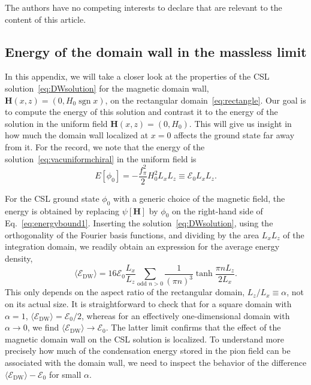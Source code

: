 \documentclass[pdflatex,iicol,sn-mathphys-num]{sn-jnl}
\let\a=\alpha
\let\p=\phi
\newcommand{\Ea}{\mathscr{E}}%
\newcommand{\vek}[1]{\bm{#1}}%
\begin{document}
The authors have no competing interests to declare that are relevant to the content of this article.


\begin{appendices}

\section{Energy of the domain wall in the massless limit}
\label{app:domainwall}

In this appendix, we will take a closer look at the properties of the CSL solution~\eqref{eq:DWsolution} for the magnetic domain wall, $\vek H(x,z)=(0,H_0\operatorname{sgn}x)$, on the rectangular domain~\eqref{eq:rectangle}. Our goal is to compute the energy of this solution and contrast it to the energy of the solution in the uniform field $\vek H(x,z)=(0,H_0)$. This will give us insight in how much the domain wall localized at $x=0$ affects the ground state far away from it. For the record, we note that the energy of the solution~\eqref{eq:vacuniformchiral} in the uniform field is
\begin{equation}
E[\p_0]=-\frac{f_\pi^2}{2}H_0^2L_xL_z\equiv\Ea_0L_xL_z.
\label{eq:Evacuniform}
\end{equation}

For the CSL ground state $\p_0$ with a generic choice of the magnetic field, the energy is obtained by replacing $\psi[\vek H]$ by $\p_0$ on the right-hand side of Eq.~\eqref{eq:energybound1}. Inserting the solution~\eqref{eq:DWsolution}, using the orthogonality of the Fourier basis functions, and dividing by the area $L_xL_z$ of the integration domain, we readily obtain an expression for the average energy density,
\begin{equation}
\langle\Ea_\text{DW}\rangle=16\Ea_0\frac{L_x}{L_z}\sum_{\text{odd }n>0}\frac{1}{(\pi n)^3}\tanh\frac{\pi nL_z}{2L_x}.
\label{eq:DWaverageE}
\end{equation}
This only depends on the aspect ratio of the rectangular domain, $L_z/L_x\equiv\a$, not on its actual size. It is straightforward to check that for a square domain with $\a=1$, $\langle\Ea_\text{DW}\rangle=\Ea_0/2$, whereas for an effectively one-dimensional domain with $\a\to0$, we find $\langle\Ea_\text{DW}\rangle\to\Ea_0$. The latter limit confirms that the effect of the magnetic domain wall on the CSL solution is localized. To understand more precisely how much of the condensation energy stored in the pion field can be associated with the domain wall, we need to inspect the behavior of the difference $\langle\Ea_\text{DW}\rangle-\Ea_0$ for small $\a$.


\end{appendices}
\end{document}
